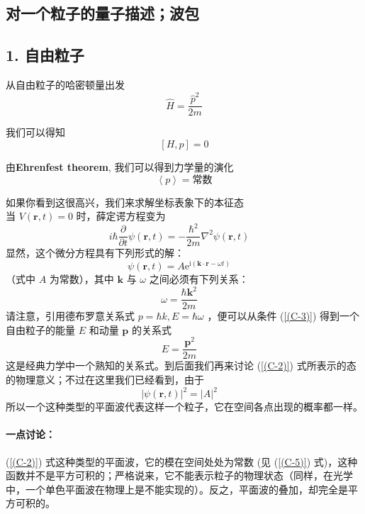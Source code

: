 \subsection{对一个粒子的量子描述；波包}
\subsection*{1. 自由粒子}
从自由粒子的哈密顿量出发
\[\hat H = \frac{{{{\hat p}^2}}}{{2m}}\]

我们可以得知
\[\left[ {H,p} \right] = 0\]

由\textbf{Ehrenfest theorem}, 我们可以得到力学量的演化
\[\left\langle p \right\rangle=\text{常数} \]

如果你看到这很高兴，我们来求解坐标表象下的本征态\\
当 $ V(\boldsymbol{r},t)=0 $ 时，薛定谔方程变为
\begin{equation}
	i\hbar\frac{\partial}{\partial t}\psi(\boldsymbol{r}, t)=-\frac{\hbar^{2}}{2 m}\nabla ^2 \psi(\boldsymbol{r}, t) \quad \label{(C-1)}
\end{equation}
显然，这个微分方程具有下列形式的解：
\begin{equation}
	\psi(\boldsymbol{r}, t)=A \mathrm{e}^{\mathrm{i}(\boldsymbol{k}\cdot\boldsymbol{r}-\omega t)} \quad \label{(C-2)}
\end{equation}
（式中 $A$ 为常数），其中 $\boldsymbol{k}$ 与 $\omega$ 之间必须有下列关系：
\begin{equation}
	\omega=\frac{\hbar\boldsymbol{k}^{2}}{2 m} \quad \label{(C-3)}
\end{equation}
请注意，引用德布罗意关系式 $p = \hbar k,E = \hbar \omega $ ，便可以从条件 (\ref{(C-3)}) 得到一个自由粒子的能量 $E$ 和动量 $\boldsymbol{p}$ 的关系式
\begin{equation}
	E=\frac{\boldsymbol{p}^{2}}{2 m} \quad \label{(C-4)}
\end{equation}
这是经典力学中一个熟知的关系式。到后面我们再来讨论 (\ref{(C-2)}) 式所表示的态的物理意义；不过在这里我们已经看到，由于
\begin{equation}
	|\psi(\boldsymbol{r}, t)|^{2}=|A|^{2} \quad \label{(C-5)}
\end{equation}
所以一个这种类型的平面波代表这样一个粒子，它在空间各点出现的概率都一样。
\paragraph*{一点讨论：}
(\ref{(C-2)}) 式这种类型的平面波，它的模在空间处处为常数 (见 (\ref{(C-5)}) 式)，这种函数并不是平方可积的；严格说来，它不能表示粒子的物理状态（同样，在光学中，一个单色平面波在物理上是不能实现的）。反之，平面波的叠加，却完全是平方可积的。

